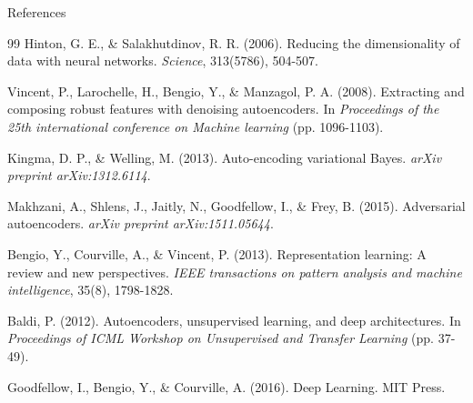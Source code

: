 \begin{frame}[allowframebreaks]{References}
    \begin{thebibliography}{99}
        Hinton, G. E., \& Salakhutdinov, R. R. (2006).
        Reducing the dimensionality of data with neural networks.
        \textit{Science}, 313(5786), 504-507.

        Vincent, P., Larochelle, H., Bengio, Y., \& Manzagol, P. A. (2008).
        Extracting and composing robust features with denoising autoencoders.
        In \textit{Proceedings of the 25th international conference on Machine learning} (pp. 1096-1103).

        Kingma, D. P., \& Welling, M. (2013).
        Auto-encoding variational Bayes.
        \textit{arXiv preprint arXiv:1312.6114}.

        Makhzani, A., Shlens, J., Jaitly, N., Goodfellow, I., \& Frey, B. (2015).
        Adversarial autoencoders.
        \textit{arXiv preprint arXiv:1511.05644}.

        Bengio, Y., Courville, A., \& Vincent, P. (2013).
        Representation learning: A review and new perspectives.
        \textit{IEEE transactions on pattern analysis and machine intelligence}, 35(8), 1798-1828.

        Baldi, P. (2012).
        Autoencoders, unsupervised learning, and deep architectures.
        In \textit{Proceedings of ICML Workshop on Unsupervised and Transfer Learning} (pp. 37-49).

        Goodfellow, I., Bengio, Y., \& Courville, A. (2016).
        Deep Learning.
        MIT Press.
    \end{thebibliography}
\end{frame}